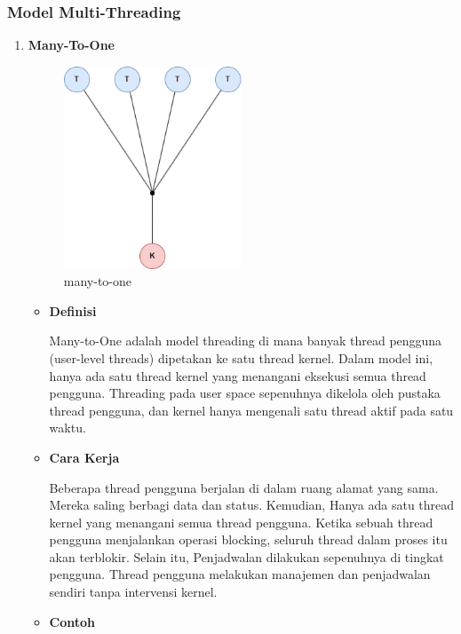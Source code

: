 \documentclass[12pt]{article}
\begin{document}
\subsubsection{Model Multi-Threading}
\begin{enumerate}
    \item\textbf{Many-To-One}
    \begin{figure}[h] 
        \centering 
        \includegraphics[width=0.5\textwidth]{asset/one to many.drawio.png} 
        \caption{many-to-one} 
        \label{fig:contoh} 
    \end{figure}
    \begin{itemize}
        \item\textbf{Definisi} 
        \par \hspace{2em} Many-to-One adalah model threading di mana banyak thread pengguna (user-level threads) dipetakan ke satu thread kernel. Dalam model ini, hanya ada satu thread kernel yang menangani eksekusi semua thread pengguna. Threading pada user space sepenuhnya dikelola oleh pustaka thread pengguna, dan kernel hanya mengenali satu thread aktif pada satu waktu.
        \item\textbf{Cara Kerja}
        \par \hspace{2em} Beberapa thread pengguna berjalan di dalam ruang alamat yang sama. Mereka saling berbagi data dan status. Kemudian, Hanya ada satu thread kernel yang menangani semua thread pengguna. Ketika sebuah thread pengguna menjalankan operasi blocking, seluruh thread dalam proses itu akan terblokir. Selain itu, Penjadwalan dilakukan sepenuhnya di tingkat pengguna. Thread pengguna melakukan manajemen dan penjadwalan sendiri tanpa intervensi kernel.
        \item\textbf{Contoh}

\end{itemize}
\end{enumerate}
\end{document}

